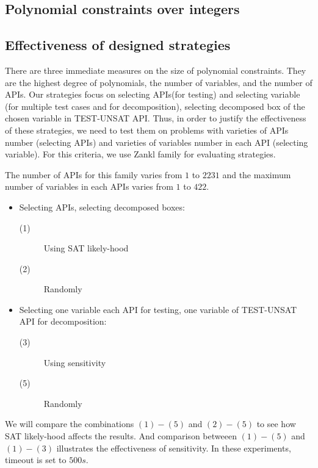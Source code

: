 \documentclass[runningheads,a4paper,oribibl]{llncs}
\begin{document}
\subsection{Polynomial constraints over integers} \label{sec:NIA}




\subsection {Effectiveness of designed strategies} 
\label{sec:strategies}
There are three immediate measures on the size of polynomial constraints. They are the highest degree of polynomials, the number of variables, and the number of APIs. Our strategies focus on selecting APIs(for testing) and selecting variable (for multiple test cases and for decomposition), selecting decomposed box of the chosen variable in TEST-UNSAT API. Thus, in order to justify the effectiveness of these strategies, we need to test them on problems with varieties of APIs number (selecting APIs) and varieties of variables number in each API (selecting variable). For this criteria, we use Zankl family for evaluating strategies. 

The number of APIs for this family varies from $1$ to $2231$ and the maximum number of variables in each APIs varies from $1$ to $422$. 


\begin{itemize}
  \item Selecting APIs, selecting decomposed boxes:
    \begin{description}
      \item[(1)] Using SAT likely-hood %
      \item[(2)] Randomly %
    \end{description}
  \item Selecting one variable each API for testing, one variable of TEST-UNSAT API for decomposition:
    \begin{description}
       \item[(3)] Using sensitivity %
       \item[(5)] Randomly %
    \end{description}
\end{itemize}

We will compare the combinations $(1)-(5)$ and $(2)-(5)$ to see how SAT likely-hood affects the results. And comparison betweeen $(1)-(5)$ and $(1)-(3)$ illustrates the effectiveness of sensitivity. In these experiments, timeout is set to $500s$.
\end{document}
